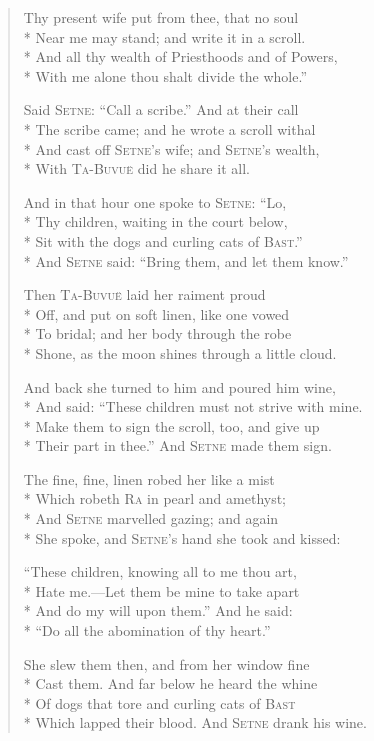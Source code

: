 \documentclass[12pt]{article}
\newcommand{\vin}{\hspace{1em}}
\begin{document}
\begin{verse}
Thy present wife put from thee, that no soul\\*
Near me may stand; and write it in a scroll.\\*
\vin And all thy wealth of Priesthoods and of Powers,\\*
With me alone thou shalt divide the whole.''

Said \textsc{Setne}: ``Call a scribe.'' And at their call\\*
The scribe came; and he wrote a scroll withal\\*
\vin And cast off \textsc{Setne}'s wife; and \textsc{Setne}'s wealth,\\*
With \textsc{Ta-Buvu\"{e}} did he share it all.

And in that hour one spoke to \textsc{Setne}: ``Lo,\\*
Thy children, waiting in the court below,\\*
\vin Sit with the dogs and curling cats of \textsc{Bast}.''\\*
And \textsc{Setne} said: ``Bring them, and let them know.''

Then \textsc{Ta-Buvu\"{e}} laid her raiment proud\\*
Off, and put on soft linen, like one vowed\\*
\vin To bridal; and her body through the robe\\*
Shone, as the moon shines through a little cloud.

And back she turned to him and poured him wine,\\*
And said: ``These children must not strive with mine.\\*
\vin Make them to sign the scroll, too, and give up\\*
Their part in thee.'' And \textsc{Setne} made them sign.

The fine, fine, linen robed her like a mist\\*
Which robeth \textsc{Ra} in pearl and amethyst;\\*
\vin And \textsc{Setne} marvelled gazing; and again\\*
She spoke, and \textsc{Setne}'s hand she took and kissed:

``These children, knowing all to me thou art,\\*
Hate me.---Let them be mine to take apart\\*
\vin And do my will upon them.'' And he said:\\*
``Do all the abomination of thy heart.''

She slew them then, and from her window fine\\*
Cast them. And far below he heard the whine\\*
\vin Of dogs that tore and curling cats of \textsc{Bast}\\*
Which lapped their blood. And \textsc{Setne} drank his wine.


\end{verse}
\end{document}
